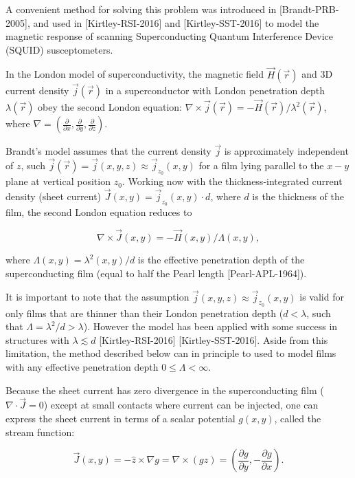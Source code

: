 \documentclass{article}
\begin{document}
A convenient method for solving this problem was introduced in [Brandt-PRB-2005], and used in [Kirtley-RSI-2016] and [Kirtley-SST-2016] to model the magnetic response of scanning Superconducting Quantum Interference Device (SQUID) susceptometers.

In the London model of superconductivity, the magnetic field $\vec{H}(\vec{r})$ and 3D current density $\vec{j}(\vec{r})$ in a superconductor with London penetration depth $\lambda(\vec{r})$ obey the second London equation:
$\nabla\times\vec{j}(\vec{r})=-\vec{H}(\vec{r})/\lambda^2(\vec{r})$, where
$\nabla=\left(\frac{\partial}{\partial x}, \frac{\partial}{\partial y}, \frac{\partial}{\partial z}\right)$.

Brandt's model assumes that the current density $\vec{j}$ is approximately independent of $z$, such $\vec{j}(\vec{r}) = \vec{j}(x, y, z)\approx\vec{j}_{z_0}(x, y)$ for a film lying parallel to the $x-y$ plane at vertical position $z_0$. Working now with the thickness-integrated current density (sheet current) $\vec{J}(x, y)=\vec{j}_{z_0}(x, y)\cdot d$, where $d$
is the thickness of the film, the second London equation reduces to

\begin{equation}
    \label{eq:london}
    \nabla\times\vec{J}(x, y)=-\vec{H}(x, y)/\Lambda(x, y),
\end{equation}

where $\Lambda(x, y)=\lambda^2(x, y)/d$ is the effective penetration depth
of the superconducting film (equal to half the Pearl length [Pearl-APL-1964]).

It is important to note that the assumption $\vec{j}(x, y, z)\approx\vec{j}_{z_0}(x, y)$ is valid for only films that are thinner than their London penetration depth ($d<\lambda$, such that $\Lambda=\lambda^2/d>\lambda$). However the model has been applied with some success in structures with $\lambda\lesssim d$ [Kirtley-RSI-2016] [Kirtley-SST-2016]. Aside from this limitation, the method described below can in principle to used to model films with any effective penetration depth $0\leq\Lambda<\infty$.

Because the sheet current has zero divergence in the superconducting film ($\nabla\cdot\vec{J}=0$)
except at small contacts where current can be injected, one can express the sheet current in terms
of a scalar potential $g(x, y)$, called the stream function:

\begin{equation}
    \label{eq:stream}
    \vec{J}(x, y) = -\hat{z}\times\nabla g
    = \nabla\times(g\hat{z})
    = \left(\frac{\partial g}{\partial y}, -\frac{\partial g}{\partial x}\right).
\end{equation}
\end{document}
